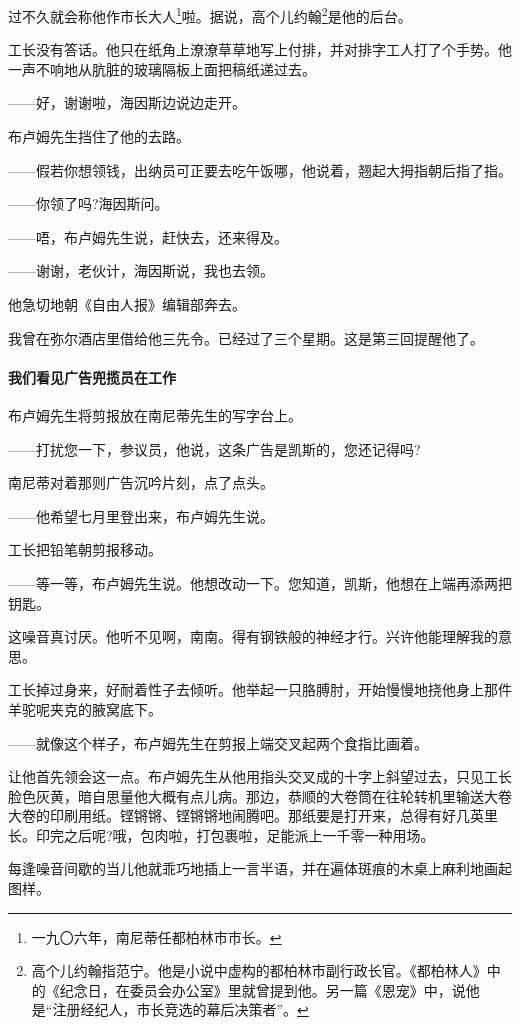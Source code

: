\par 过不久就会称他作市长大人\footnote{一九〇六年，南尼蒂任都柏林市市长。}啦。据说，高个儿约翰\footnote{高个儿约翰指范宁。他是小说中虚构的都柏林市副行政长官。《都柏林人》中的《纪念日，在委员会办公室》里就曾提到他。另一篇《恩宠》中，说他是“注册经纪人，市长竞选的幕后决策者”。}是他的后台。
\par 工长没有答话。他只在纸角上潦潦草草地写上付排，并对排字工人打了个手势。他一声不响地从肮脏的玻璃隔板上面把稿纸递过去。
\par ——好，谢谢啦，海因斯边说边走开。
\par 布卢姆先生挡住了他的去路。
\par ——假若你想领钱，出纳员可正要去吃午饭哪，他说着，翘起大拇指朝后指了指。
\par ——你领了吗?海因斯问。
\par ——唔，布卢姆先生说，赶快去，还来得及。
\par ——谢谢，老伙计，海因斯说，我也去领。
\par 他急切地朝《自由人报》编辑部奔去。
\par 我曾在弥尔酒店里借给他三先令。已经过了三个星期。这是第三回提醒他了。
\paragraph*{我们看见广告兜揽员在工作}
\par 布卢姆先生将剪报放在南尼蒂先生的写字台上。
\par ——打扰您一下，参议员，他说，这条广告是凯斯的，您还记得吗?
\par 南尼蒂对着那则广告沉吟片刻，点了点头。
\par ——他希望七月里登出来，布卢姆先生说。
\par 工长把铅笔朝剪报移动。
\par ——等一等，布卢姆先生说。他想改动一下。您知道，凯斯，他想在上端再添两把钥匙。
\par 这噪音真讨厌。他听不见啊，南南。得有钢铁般的神经才行。兴许他能理解我的意思。
\par 工长掉过身来，好耐着性子去倾听。他举起一只胳膊肘，开始慢慢地挠他身上那件羊驼呢夹克的腋窝底下。
\par ——就像这个样子，布卢姆先生在剪报上端交叉起两个食指比画着。
\par 让他首先领会这一点。布卢姆先生从他用指头交叉成的十字上斜望过去，只见工长脸色灰黄，暗自思量他大概有点儿病。那边，恭顺的大卷筒在往轮转机里输送大卷大卷的印刷用纸。铿锵锵、铿锵锵地闹腾吧。那纸要是打开来，总得有好几英里长。印完之后呢?哦，包肉啦，打包裹啦，足能派上一千零一种用场。
\par 每逢噪音间歇的当儿他就乖巧地插上一言半语，并在遍体斑痕的木桌上麻利地画起图样。
